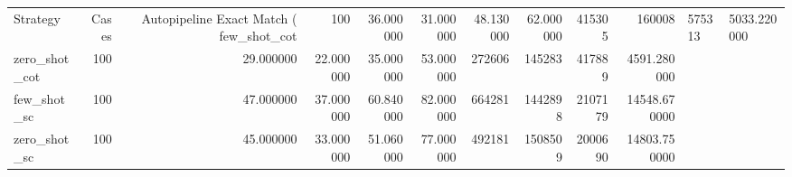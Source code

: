\begin{tabular}{lrrrrrrrrr}
\toprule
Strategy & Cases & Autopipeline Exact Match (%
\midrule
few_shot_cot & 100 & 36.000000 & 31.000000 & 48.130000 & 62.000000 & 415305 & 160008 & 575313 & 5033.220000 \\
zero_shot_cot & 100 & 29.000000 & 22.000000 & 35.000000 & 53.000000 & 272606 & 145283 & 417889 & 4591.280000 \\
few_shot_sc & 100 & 47.000000 & 37.000000 & 60.840000 & 82.000000 & 664281 & 1442898 & 2107179 & 14548.670000 \\
zero_shot_sc & 100 & 45.000000 & 33.000000 & 51.060000 & 77.000000 & 492181 & 1508509 & 2000690 & 14803.750000 \\
\bottomrule
\end{tabular}
